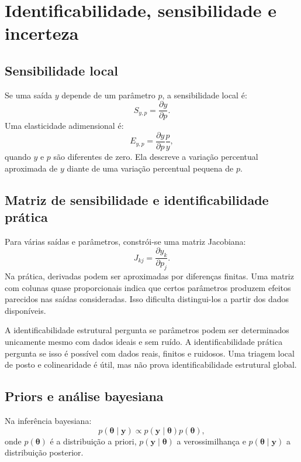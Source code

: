 \documentclass[11pt,a4paper,oneside]{book}
\newcommand{\pder}[2]{\frac{\partial #1}{\partial #2}}
\begin{document}
\chapter{Identificabilidade, sensibilidade e incerteza}

\section{Sensibilidade local}
Se uma saída $y$ depende de um parâmetro $p$, a sensibilidade local é:
\begin{equation}
  S_{y,p}=\pder{y}{p}.
\end{equation}
Uma elasticidade adimensional é:
\begin{equation}
  E_{y,p}=\pder{y}{p}\frac{p}{y},
\end{equation}
quando $y$ e $p$ são diferentes de zero. Ela descreve a variação percentual aproximada de $y$ diante de uma variação percentual pequena de $p$.

\section{Matriz de sensibilidade e identificabilidade prática}
Para várias saídas e parâmetros, constrói-se uma matriz Jacobiana:
\begin{equation}
  J_{kj}=\pder{y_k}{p_j}.
\end{equation}
Na prática, derivadas podem ser aproximadas por diferenças finitas. Uma matriz com colunas quase proporcionais indica que certos parâmetros produzem efeitos parecidos nas saídas consideradas. Isso dificulta distingui-los a partir dos dados disponíveis.

A identificabilidade estrutural pergunta se parâmetros podem ser determinados unicamente mesmo com dados ideais e sem ruído. A identificabilidade prática pergunta se isso é possível com dados reais, finitos e ruidosos. Uma triagem local de posto e colinearidade é útil, mas não prova identificabilidade estrutural global.

\section{Priors e análise bayesiana}
Na inferência bayesiana:
\begin{equation}
  p(\bm{\theta}\mid\bm{y})\propto
  p(\bm{y}\mid\bm{\theta})p(\bm{\theta}),
\end{equation}
onde $p(\bm{\theta})$ é a distribuição a priori, $p(\bm{y}\mid\bm{\theta})$ a verossimilhança e $p(\bm{\theta}\mid\bm{y})$ a distribuição posterior.
\end{document}
